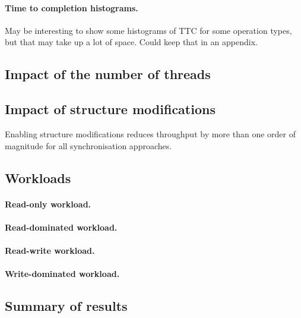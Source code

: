 \documentclass[12pt,a4paper,oneside,openright]{report}
\begin{document}
\paragraph{Time to completion histograms.}
May be interesting to show some histograms of TTC for some operation
types, but that may take up a lot of space. Could keep that in an
appendix.

\subsection{Impact of the number of threads}
\label{sec:eval:impact-numb-thre}

\subsection{Impact of structure modifications}
\label{sec:impl:impact-struct-modif}

Enabling structure modifications reduces throughput by more than one
order of magnitude for all synchronisation approaches.

\subsection{Workloads}
\label{sec:impl:workloads}

\paragraph{Read-only workload.}
\label{sec:impl:read-only-workload}

\paragraph{Read-dominated workload.}
\label{sec:eval:read-domin-workl}

\paragraph{Read-write workload.}
\label{sec:impl:read-write-workload}

\paragraph{Write-dominated workload.}
\label{sec:eval:write-domin-workl}


\subsection{Summary of results}
\label{sec:eval:summary-results}
\end{document}
